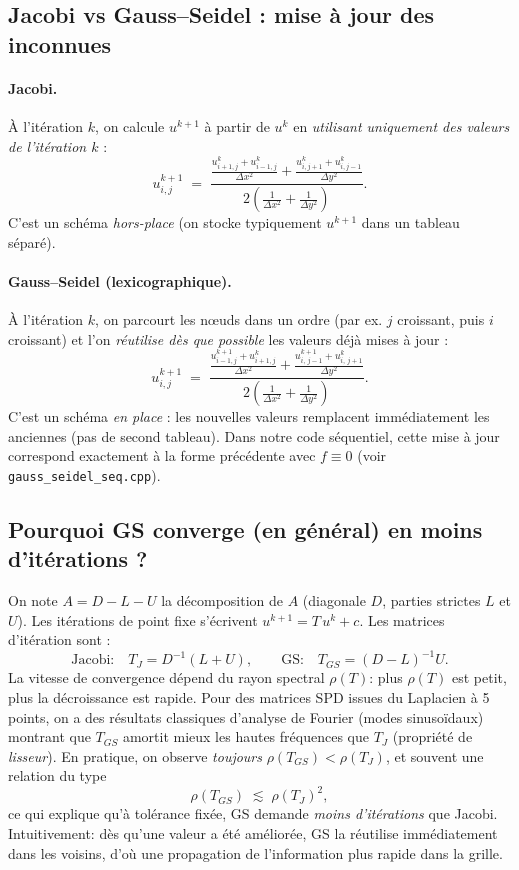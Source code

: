 \documentclass{article}
\begin{document}
\subsection{Jacobi vs Gauss--Seidel : mise à jour des inconnues}
\paragraph{Jacobi.} À l’itération $k$, on calcule $u^{k+1}$ à partir de $u^k$ en \emph{utilisant uniquement des valeurs de l’itération $k$} :
\[
u^{k+1}_{i,j} \;=\;
\frac{
\frac{u^k_{i+1,j}+u^k_{i-1,j}}{\Delta x^2}
+
\frac{u^k_{i,j+1}+u^k_{i,j-1}}{\Delta y^2}
}{
2\!\left(\frac{1}{\Delta x^2}+\frac{1}{\Delta y^2}\right)}.
\]
C’est un schéma \emph{hors-place} (on stocke typiquement $u^{k+1}$ dans un tableau séparé).

\paragraph{Gauss--Seidel (lexicographique).} À l’itération $k$, on parcourt les n{\oe}uds dans un ordre (par ex. $j$ croissant, puis $i$ croissant) et l’on \emph{réutilise dès que possible} les valeurs déjà mises à jour :
\[
u^{k+1}_{i,j} \;=\;
\frac{
\frac{u^{k+1}_{i-1,j}+u^{k}_{i+1,j}}{\Delta x^2}
+
\frac{u^{k+1}_{i,\,j-1}+u^{k}_{i,\,j+1}}{\Delta y^2}
}{
2\!\left(\frac{1}{\Delta x^2}+\frac{1}{\Delta y^2}\right)}.
\]
C’est un schéma \emph{en place} : les nouvelles valeurs remplacent immédiatement les anciennes (pas de second tableau). Dans notre code séquentiel, cette mise à jour correspond exactement à la forme précédente avec $f\equiv0$ (voir \texttt{gauss\_seidel\_seq.cpp}). \cite{gsseq}

\subsection{Pourquoi GS converge (en général) en moins d’itérations ?}
On note $A=D-L-U$ la décomposition de $A$ (diagonale $D$, parties strictes $L$ et $U$).
Les itérations de point fixe s’écrivent $u^{k+1}=T\,u^{k}+c$. Les matrices d’itération sont :
\[
\text{Jacobi:}\quad T_J = D^{-1}(L+U),
\qquad
\text{GS:}\quad T_{GS} = (D-L)^{-1}U.
\]
La vitesse de convergence dépend du rayon spectral $\rho(T)$: plus $\rho(T)$ est petit, plus la décroissance est rapide. Pour des matrices SPD issues du Laplacien à 5 points, on a des résultats classiques d’analyse de Fourier (modes sinusoïdaux) montrant que $T_{GS}$ amortit mieux les hautes fréquences que $T_J$ (propriété de \emph{lisseur}). En pratique, on observe \emph{toujours} $\rho(T_{GS}) < \rho(T_J)$, et souvent une relation du type
\[
\rho(T_{GS}) \;\lesssim\; \rho(T_J)^2,
\]
ce qui explique qu’à tolérance fixée, GS demande \emph{moins d’itérations} que Jacobi. Intuitivement: dès qu’une valeur a été améliorée, GS la réutilise immédiatement dans les voisins, d’où une propagation de l’information plus rapide dans la grille.
\end{document}
